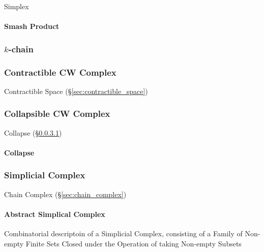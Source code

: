 Simplex %



\paragraph{Smash Product}\label{sec:smash_product}\hfill



\subsubsection{$k$-chain}\label{sec:k_chain}




\subsubsection{Contractible CW Complex}
\label{sec:contractible_cwcomplex}

Contractible Space (\S\ref{sec:contractible_space})



\subsubsection{Collapsible CW Complex}
\label{sec:collapsible_cwcomplex}

Collapse (\S\ref{sec:collapse})



\paragraph{Collapse}\label{sec:collapse}\hfill



\subsubsection{Simplicial Complex}\label{sec:simplicial_complex}

Chain Complex (\S\ref{sec:chain_complex})



\paragraph{Abstract Simplical Complex}\label{sec:abstract_complex}\hfill

Combinatorial descriptoin of a Simplicial Complex, consisting of a Family of
Non-empty Finite Sets Closed under the Operation of taking Non-empty Subsets

